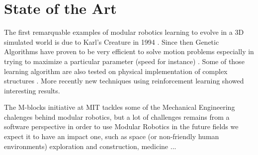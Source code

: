 
\chapter{State of the Art} %

\label{Chapter 1} %




The first remarquable examples of modular robotics learning to evolve in a 3D simulated world is due to Karl's Creature in 1994 \cite{karl}. Since then Genetic Algorithms have proven to be very efficient to solve motion problems especially in trying to maximize a particular parameter (speed for instance) \cite{marbach} \cite{heinen} \cite{schaffer} \cite{sproewitz}. Some of those learning algorithm are also tested on physical implementation of complex structures \cite{aibo} \cite{schaffer}. More recently new techniques using reinforcement learning \cite{christensen} showed interesting results. 

The M-blocks initiative at MIT \cite{mitcubes} tackles some of the Mechanical Engineering chalenges behind modular robotics, but a lot of challenges remains from a software perspective in order to use Modular Robotics in the future fields we expect it to have an impact one, such as space (or non-friendly human environments) exploration and construction, medicine ... 


